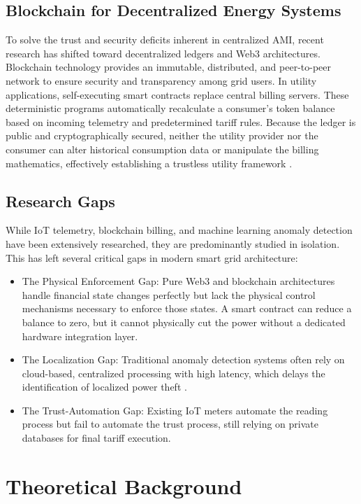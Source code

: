 \subsection{Blockchain for Decentralized Energy Systems}
To solve the trust and security deficits inherent in centralized AMI, recent research has shifted toward decentralized ledgers and Web3 architectures. Blockchain technology provides an immutable, distributed, and peer-to-peer network to ensure security and transparency among grid users. In utility applications, self-executing smart contracts replace central billing servers. These deterministic programs automatically recalculate a consumer's token balance based on incoming telemetry and predetermined tariff rules. Because the ledger is public and cryptographically secured, neither the utility provider nor the consumer can alter historical consumption data or manipulate the billing mathematics, effectively establishing a trustless utility framework \cite{mololoth2023blockchain,dong2023blockchain}.

\subsection{Research Gaps}
While IoT telemetry, blockchain billing, and machine learning anomaly detection have been extensively researched, they are predominantly studied in isolation. This has left several critical gaps in modern smart grid architecture:

\begin{itemize}
    \item The Physical Enforcement Gap: Pure Web3 and blockchain architectures handle financial state changes perfectly but lack the physical control mechanisms necessary to enforce those states. A smart contract can reduce a balance to zero, but it cannot physically cut the power without a dedicated hardware integration layer.
    \item The Localization Gap: Traditional anomaly detection systems often rely on cloud-based, centralized processing with high latency, which delays the identification of localized power theft \cite{jithish2023anomaly,husnoo2023misbehaviour}.
    \item The Trust-Automation Gap: Existing IoT meters automate the reading process but fail to automate the trust process, still relying on private databases for final tariff execution.
\end{itemize}


\section{Theoretical Background}
